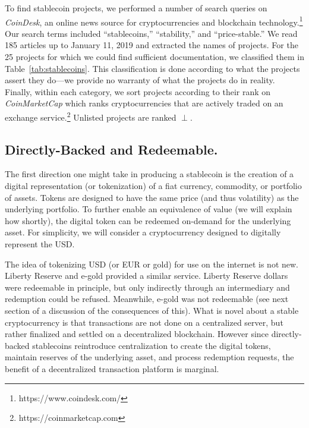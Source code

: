 To find stablecoin projects, we performed a number of search queries on \textit{CoinDesk}, an online news source for cryptocurrencies and blockchain technology.\footnote{https://www.coindesk.com/} Our search terms included ``stablecoins,'' ``stability,'' and ``price-stable.'' We read 185 articles up to January 11, 2019 and extracted the names of projects. For the 25 projects for which we could find sufficient documentation, we classified them in Table~\ref{tab:stablecoins}. This classification is done according to what the projects assert they do---we provide no warranty of what the projects do in reality. Finally, within each category, we sort projects according to their rank on \textit{CoinMarketCap} which ranks cryptocurrencies that are actively traded on an exchange service.\footnote{https://coinmarketcap.com} Unlisted projects are ranked $\perp$.


\subsection{Directly-Backed and Redeemable.}

The first direction one might take in producing a stablecoin is the creation of a digital representation (or tokenization) of a fiat currency, commodity, or portfolio of assets. Tokens are designed to have the same price (and thus volatility) as the underlying portfolio. To further enable an equivalence of value (we will explain how shortly), the digital token can be redeemed on-demand for the underlying asset. For simplicity, we will consider a cryptocurrency designed to digitally represent the USD.

The idea of tokenizing USD (or EUR or gold) for use on the internet is not new. Liberty Reserve and e-gold provided a similar service. Liberty Reserve dollars were redeemable in principle, but only indirectly through an intermediary and redemption could be refused. Meanwhile, e-gold was not redeemable (see next section of a discussion of the consequences of this). What is novel about a stable cryptocurrency is that transactions are not done on a centralized server, but rather finalized and settled on a decentralized blockchain. However since directly-backed stablecoins reintroduce centralization to create the digital tokens, maintain reserves of the underlying asset, and process redemption requests, the benefit of a decentralized transaction platform is marginal.

